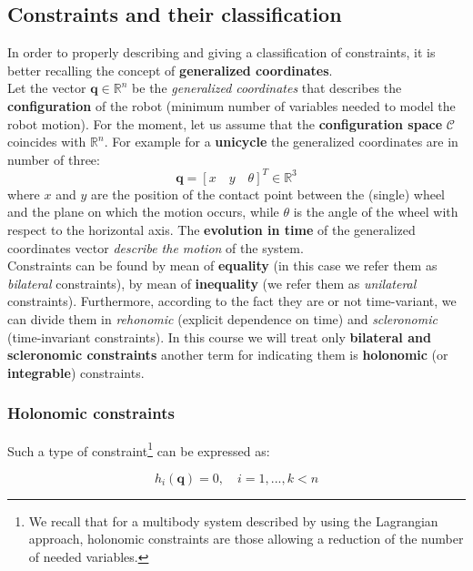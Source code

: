 \subsection{Constraints and their classification}
In order to properly describing and giving a classification of constraints, it is better recalling the concept of \textbf{generalized coordinates}. \\
Let the vector $\mathbf{q}\in\mathbb{R}^n$ be the \emph{generalized coordinates} that describes the \textbf{configuration} of the robot (minimum number of variables needed to model the robot motion). For the moment, let us assume that the \textbf{configuration space} $\mathcal{C}$ coincides with $\mathbb{R}^n$. For example for a \textbf{unicycle} the generalized coordinates are in number of three: 
\begin{equation}\label{eq:gen_coord_unicyle}
    \mathbf{q}=[x \quad y \quad \theta]^T\in\mathbb{R}^3
\end{equation}
where $x$ and $y$ are the position of the contact point between the (single) wheel and the plane on which the motion occurs, while $\theta$ is the angle of the wheel with respect to the horizontal axis. The \textbf{evolution in time} of the generalized coordinates vector \textit{describe the motion} of the system.\\

Constraints can be found by mean of \textbf{equality} (in this case we refer them as \textit{bilateral} constraints), by mean of \textbf{inequality} (we refer them as \textit{unilateral} constraints). Furthermore, according to the fact they are or not time-variant, we can divide them in \textit{rehonomic} (explicit dependence on time) and \textit{scleronomic} (time-invariant constraints). In this course we will treat only \textbf{bilateral and scleronomic constraints} another term for indicating them is \textbf{holonomic} (or \textbf{integrable}) constraints.

\subsubsection{Holonomic constraints}
Such a type of constraint\footnote{
    We recall that for a multibody system described by using the Lagrangian approach, holonomic constraints are those allowing a reduction of the number of needed variables.
} can be expressed as: 

\begin{equation}
    h_i(\mathbf{q})=0, \quad i=1,...,k<n
\end{equation}

